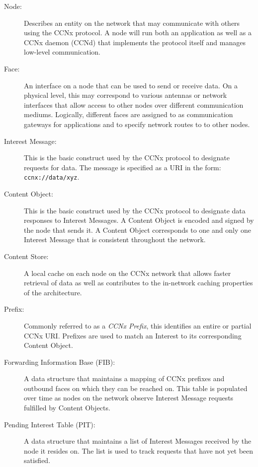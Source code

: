 \documentclass[a4paper,12pt]{report}      %
\begin{document}
\begin{description}
\item[Node:] Describes an entity on the network that may communicate with others using the CCNx protocol. A node will run both an application as well as a CCNx daemon (CCNd) that implements the protocol itself and manages low-level communication.

\item[Face:] An interface on a node that can be used to send or receive data. On a physical level, this may correspond to various antennas or network interfaces that allow access to other nodes over different communication mediums. Logically, different faces are assigned to as communication gateways for applications and to specify network routes to to other nodes.

\item[Interest Message:] This is the basic construct used by the CCNx protocol to designate requests for data. The message is specified as a URI in the form: \verb!ccnx://data/xyz!. 

\item[Content Object:] This is the basic construct used by the CCNx protocol to designate data responses to Interest Messages. A Content Object is encoded and signed by the node that sends it. A Content Object corresponds to one and only one Interest Message that is consistent throughout the network.

\item[Content Store:] A local cache on each node on the CCNx network that allows faster retrieval of data as well as contributes to the in-network caching properties of the architecture.

\item[Prefix:] Commonly referred to as a \emph{CCNx Prefix}, this identifies an entire or partial CCNx URI. Prefixes are used to match an Interest to its corresponding Content Object.

\item[Forwarding Information Base (FIB):] A data structure that maintains a mapping of CCNx prefixes and outbound faces on which they can be reached on. This table is populated over time as nodes on the network observe Interest Message requests fulfilled by Content Objects.

\item[Pending Interest Table (PIT):] A data structure that maintains a list of Interest Messages received by the node it resides on. The list is used to track requests that have not yet been satisfied.

\end{description}
\end{document}
